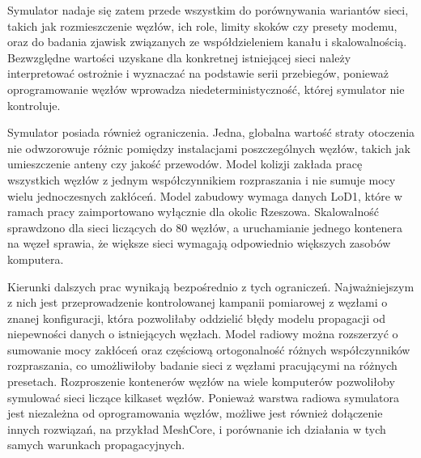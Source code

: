 Symulator nadaje się zatem przede wszystkim do porównywania wariantów sieci, takich jak rozmieszczenie węzłów, ich role, limity skoków czy presety modemu, oraz do badania zjawisk związanych ze współdzieleniem kanału i skalowalnością. Bezwzględne wartości uzyskane dla konkretnej istniejącej sieci należy interpretować ostrożnie i wyznaczać na podstawie serii przebiegów, ponieważ oprogramowanie węzłów wprowadza niedeterministyczność, której symulator nie kontroluje.

Symulator posiada również ograniczenia. Jedna, globalna wartość straty otoczenia nie odwzorowuje różnic pomiędzy instalacjami poszczególnych węzłów, takich jak umieszczenie anteny czy jakość przewodów. Model kolizji zakłada pracę wszystkich węzłów z jednym współczynnikiem rozpraszania i nie sumuje mocy wielu jednoczesnych zakłóceń. Model zabudowy wymaga danych LoD1, które w ramach pracy zaimportowano wyłącznie dla okolic Rzeszowa. Skalowalność sprawdzono dla sieci liczących do 80 węzłów, a uruchamianie jednego kontenera na węzeł sprawia, że większe sieci wymagają odpowiednio większych zasobów komputera.

Kierunki dalszych prac wynikają bezpośrednio z tych ograniczeń. Najważniejszym z nich jest przeprowadzenie kontrolowanej kampanii pomiarowej z węzłami o znanej konfiguracji, która pozwoliłaby oddzielić błędy modelu propagacji od niepewności danych o istniejących węzłach. Model radiowy można rozszerzyć o sumowanie mocy zakłóceń oraz częściową ortogonalność różnych współczynników rozpraszania, co umożliwiłoby badanie sieci z węzłami pracującymi na różnych presetach. Rozproszenie kontenerów węzłów na wiele komputerów pozwoliłoby symulować sieci liczące kilkaset węzłów. Ponieważ warstwa radiowa symulatora jest niezależna od oprogramowania węzłów, możliwe jest również dołączenie innych rozwiązań, na przykład MeshCore, i porównanie ich działania w tych samych warunkach propagacyjnych.
